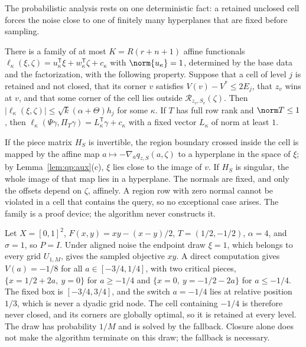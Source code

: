 The probabilistic analysis rests on one deterministic fact: a retained
unclosed cell forces the noise close to one of finitely many hyperplanes that
are fixed before sampling.

\begin{lemma}\label{lem:qp:tube}
There is a family of at most $K=R(r+n+1)$ affine functionals
$\ell_\kappa(\xi,\zeta)=u_\kappa^{\mathsf T}\xi+w_\kappa^{\mathsf T}\zeta+c_\kappa$ with
$\norm{u_\kappa}=1$, determined by the base data and the factorization, with
the following property. Suppose that a cell of level $j$ is retained and not
closed, that its corner $v$ satisfies $V(v)-V^*\le2E_j$, that $z_v$ wins at
$v$, and that some corner of the cell lies outside
$\mathcal R_{z_v,S_v}(\zeta)$. Then
$|\ell_\kappa(\xi,\zeta)|\le\sqrt k(\alpha+\Theta)h_j$ for some $\kappa$. If
$T$ has full row rank and $\norm T\le1$, then
$\ell_\kappa(\Psi\gamma,\Pi_T\gamma)=L_\kappa^{\mathsf T}\gamma+c_\kappa$ with a
fixed vector $L_\kappa$ of norm at least $1$.
\end{lemma}

If the piece matrix $H_S$ is invertible, the region boundary crossed inside
the cell is mapped by the affine map $a\mapsto-\nabla_aq_{z,S}(a,\zeta)$ to a
hyperplane in the space of $\xi$; by Lemma~\ref{lem:qp:aux}(c), $\xi$ lies
close to the image of $v$. If $H_S$ is singular, the whole image of that
map lies in a hyperplane. The normals are fixed, and only the offsets depend on
$\zeta$, affinely. A region row with zero normal cannot be violated in a cell
that contains the query, so no exceptional case arises. The family is a proof
device; the algorithm never constructs it.

\begin{example}\label{ex:qp:atom}
Let $X=[0,1]^2$, $F(x,y)=xy-(x-y)/2$, $T=(1/2,-1/2)$, $\alpha=4$, and
$\sigma=1$, so $P=I$. Under aligned noise the endpoint draw $\xi=1$, which
belongs to every grid $U_{1,M}$, gives the sampled objective $xy$.
A direct computation gives $V(a)=-1/8$ for all $a\in[-3/4,1/4]$, with two
critical pieces, $\{x=1/2+2a,\ y=0\}$ for $a\ge-1/4$ and
$\{x=0,\ y=-1/2-2a\}$ for $a\le-1/4$. The fixed box is $[-3/4,3/4]$, and the
switch $a=-1/4$ lies at relative position $1/3$, which is never a dyadic grid
node. The cell containing $-1/4$ is therefore never closed, and its corners are
globally optimal, so it is retained at every level. The draw has probability
$1/M$ and is solved by the fallback. Closure alone does not make the
algorithm terminate on this draw; the fallback is necessary.
\end{example}

